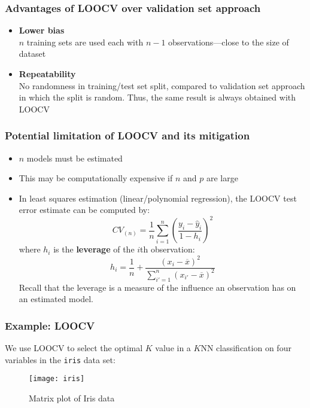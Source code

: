 \documentclass[smaller]{beamer}
\newcommand{\lt}{\left}
\newcommand{\rt}{\right}
\newcommand{\?}{\stackrel{?}{=}}
\newcommand{\fr}{\frac}
\newcommand{\ol}{\overline}
\begin{document}
\begin{frame}
  \frametitle{Advantages of LOOCV over validation set approach}
  \begin{itemize}[<+->]
  \item \textbf{Lower bias}\\\pause
    $n$ training sets are used each with $n-1$ observations---close to the size of dataset\\[2mm]

  \item \textbf{Repeatability}\\\pause
    No randomness in training/test set split, compared to validation set approach in which the split is random. \pause
    Thus, the same result is always obtained with LOOCV
  \end{itemize}

\end{frame}

\begin{frame}
  \frametitle{Potential limitation of LOOCV and its mitigation}
  \begin{itemize}[<+->]
  \item $n$ models must be estimated
  \item This may be computationally expensive if $n$ and $p$ are large
  \item In least squares estimation (linear/polynomial regression),
    the LOOCV test error estimate can be computed by:\pause
    \begin{equation}
      \label{eq:13}
      CV_{(n)} = \fr1n \sum_{i=1}^n\lt(\fr{y_i - \hat y_i}{1 - h_i}\rt)^2
    \end{equation}\pause
    where $h_i$ is the \textbf{leverage} of the $i$th observation:\pause
    \begin{equation}
      \label{eq:14}
      h_i = \fr1n + \fr{(x_i - \ol{x})^2}{\sum_{i'=1}^n(x_{i'}- \ol{x})^2}
    \end{equation}\pause
    Recall that the leverage is a measure of the influence an observation has on an estimated model.
  \end{itemize}
\end{frame}

\begin{frame}
  \frametitle{Example: LOOCV}\pause
  We use LOOCV to select the optimal $K$ value in a $K$NN classification on four variables in the \texttt{iris} data set:
  \pause
  \begin{figure}[h!]
    \centering
    \texttt{[image: iris]}
    \caption{Matrix plot of Iris data}
    \label{fig:mat}
  \end{figure}
\end{frame}
\end{document}

